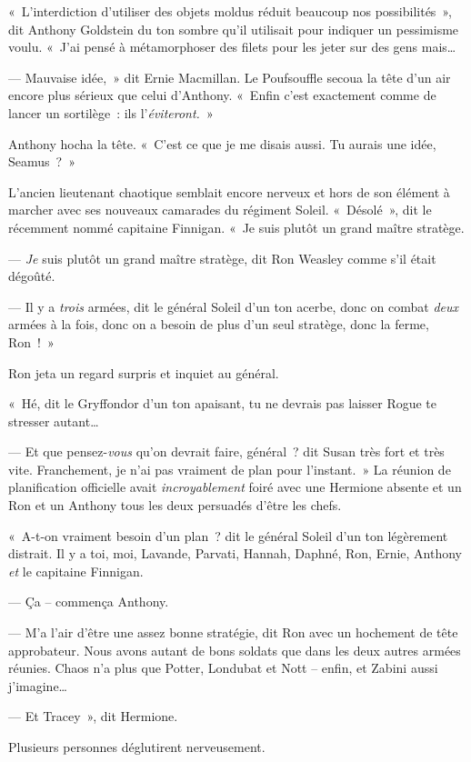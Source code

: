«~L'interdiction d'utiliser des objets moldus réduit beaucoup nos possibilités~», dit Anthony Goldstein du ton sombre qu'il utilisait pour indiquer un pessimisme voulu.
«~J'ai pensé à métamorphoser des filets pour les jeter sur des gens mais…

--- Mauvaise idée,~» dit Ernie Macmillan.
Le Poufsouffle secoua la tête d'un air encore plus sérieux que celui d'Anthony.
«~Enfin c'est exactement comme de lancer un sortilège~: ils l'\emph{éviteront.}~»

Anthony hocha la tête.
«~C'est ce que je me disais aussi.
Tu aurais une idée, Seamus~?~»

L'ancien lieutenant chaotique semblait encore nerveux et hors de son élément à marcher avec ses nouveaux camarades du régiment Soleil.
«~Désolé~», dit le récemment nommé capitaine Finnigan.
«~Je suis plutôt un grand maître stratège.

--- \emph{Je} suis plutôt un grand maître stratège, dit Ron Weasley comme s'il était dégoûté.

--- Il y a \emph{trois} armées, dit le général Soleil d'un ton acerbe, donc on combat \emph{deux} armées à la fois, donc on a besoin de plus d'un seul stratège, donc la ferme, Ron~!~»

Ron jeta un regard surpris et inquiet au général.

«~Hé, dit le Gryffondor d'un ton apaisant, tu ne devrais pas laisser Rogue te stresser autant…

--- Et que pensez-\emph{vous} qu'on devrait faire, général~? dit Susan très fort et très vite.
Franchement, je n'ai pas vraiment de plan pour l'instant.~»
La réunion de planification officielle avait \emph{incroyablement} foiré avec une Hermione absente et un Ron et un Anthony tous les deux persuadés d'être les chefs.

«~A-t-on vraiment besoin d'un plan~? dit le général Soleil d'un ton légèrement distrait.
Il y a toi, moi, Lavande, Parvati, Hannah, Daphné, Ron, Ernie, Anthony \emph{et} le capitaine Finnigan.

--- Ça -- commença Anthony.

--- M'a l'air d'être une assez bonne stratégie, dit Ron avec un hochement de tête approbateur.
Nous avons autant de bons soldats que dans les deux autres armées réunies.
Chaos n'a plus que Potter, Londubat et Nott -- enfin, et Zabini aussi j'imagine…

--- Et Tracey~», dit Hermione.

Plusieurs personnes déglutirent nerveusement.


